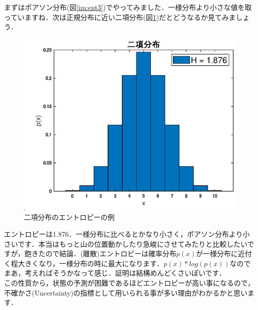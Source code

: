 \documentclass[11pt,a4paper,uplatex]{ujreport}
\begin{document}
まずはポアソン分布(図\ref{im:ent3})でやってみました．一様分布より小さな値を取っていますね．次は正規分布に近い二項分布(図\ref{im:ent4})だとどうなるか見てみましょう．

\begin{figure}[H]
\label{im:ent4}
  \centering
  \includegraphics[width=15cm]{../figures/ent_bi.eps}
  \caption{二項分布のエントロピーの例}
\end{figure}

エントロピーは1.876．一様分布に比べるとかなり小さく，ポアソン分布より小さいです．本当はもっと山の位置動かしたり急峻にさせてみたりと比較したいですが，飽きたので結論．(離散)エントロピーは確率分布$p(x)$が一様分布に近付く程大きくなり，一様分布の時に最大になります．$p(x) * log(p(x))$なのでまあ，考えればそうかなって感じ．証明は結構めんどくさいぽいです．\\

この性質から，状態の予測が困難であるほどエントロピーが高い事になるので，不確かさ(Uncertainty)の指標として用いられる事が多い理由がわかるかと思います．\\
\\
\end{document}
